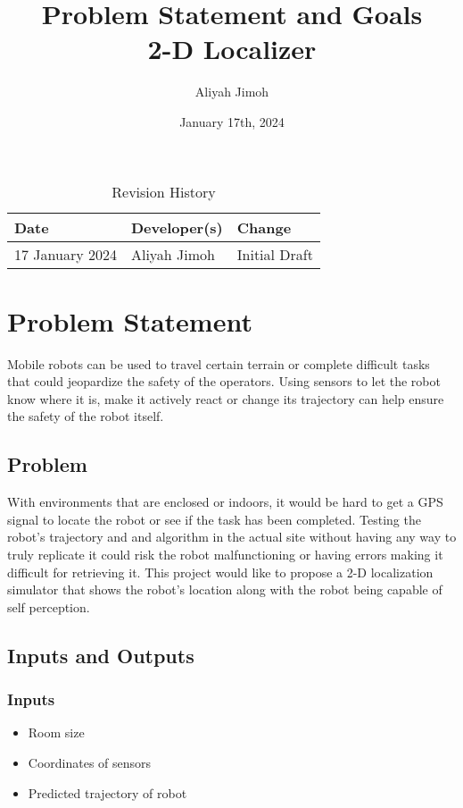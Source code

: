 \documentclass{article}
\title{Problem Statement and Goals\\2-D Localizer}
\author{Aliyah Jimoh}
\date{January 17th, 2024}
\begin{document}
\maketitle

\begin{table}[hp]
\caption{Revision History} \label{TblRevisionHistory}
\begin{tabularx}{\textwidth}{llX}
\toprule
\textbf{Date} & \textbf{Developer(s)} & \textbf{Change}\\
\midrule
17 January 2024 & Aliyah Jimoh & Initial Draft\\

\bottomrule
\end{tabularx}
\end{table}

\section{Problem Statement}
Mobile robots can be used to travel certain terrain or complete difficult tasks that could jeopardize the safety of the operators. Using sensors to let the robot know where it is, make it actively react or change its trajectory can help ensure the safety of the robot itself.
\subsection{Problem}
With environments that are enclosed or indoors, it would be hard to get a GPS signal to locate the robot or see if the task has been completed. Testing the robot's trajectory and and algorithm in the actual site without having any way to truly replicate it could risk the robot malfunctioning or having errors making it difficult for retrieving it. This project would like to propose a 2-D localization simulator that shows the robot's location along with the robot being capable of self perception.

\subsection{Inputs and Outputs}

\subsubsection{Inputs}
\begin{itemize}
    \item Room size  
    \item Coordinates of sensors
    \item Predicted trajectory of robot
\end{itemize}
\end{document}
